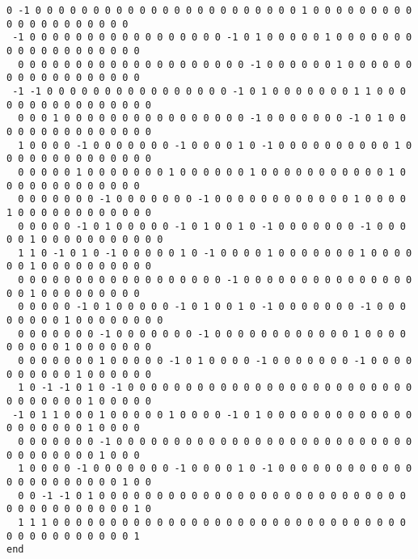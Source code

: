 \documentclass[%
  twocolumn,
 showpacs,
 showkeys,
 preprintnumbers,
 amsmath,amssymb,
 aps,
  pra,
  longbibliography,
 floatfix,
 ]{revtex4-1}
\begin{document}
{\begin{lstlisting}[backgroundcolor=\color{yellow!10},framerule=0pt,breaklines=true, frame=tb]
  0 -1 0 0 0 0 0 0 0 0 0 0 0 0 0 0 0 0 0 0 0 0 0 0 0 1 0 0 0 0 0 0 0 0 0 0 0 0 0 0 0 0 0 0 0 0
 -1 0 0 0 0 0 0 0 0 0 0 0 0 0 0 0 0 0 -1 0 1 0 0 0 0 0 1 0 0 0 0 0 0 0 0 0 0 0 0 0 0 0 0 0 0 0
  0 0 0 0 0 0 0 0 0 0 0 0 0 0 0 0 0 0 0 0 -1 0 0 0 0 0 0 1 0 0 0 0 0 0 0 0 0 0 0 0 0 0 0 0 0 0
 -1 -1 0 0 0 0 0 0 0 0 0 0 0 0 0 0 0 0 -1 0 1 0 0 0 0 0 0 0 1 1 0 0 0 0 0 0 0 0 0 0 0 0 0 0 0 0
  0 0 0 1 0 0 0 0 0 0 0 0 0 0 0 0 0 0 0 0 -1 0 0 0 0 0 0 0 -1 0 1 0 0 0 0 0 0 0 0 0 0 0 0 0 0 0
  1 0 0 0 0 -1 0 0 0 0 0 0 0 -1 0 0 0 0 1 0 -1 0 0 0 0 0 0 0 0 0 0 1 0 0 0 0 0 0 0 0 0 0 0 0 0 0
  0 0 0 0 0 1 0 0 0 0 0 0 0 1 0 0 0 0 0 0 1 0 0 0 0 0 0 0 0 0 0 0 1 0 0 0 0 0 0 0 0 0 0 0 0 0
  0 0 0 0 0 0 0 -1 0 0 0 0 0 0 0 -1 0 0 0 0 0 0 0 0 0 0 0 0 1 0 0 0 0 1 0 0 0 0 0 0 0 0 0 0 0 0
  0 0 0 0 0 -1 0 1 0 0 0 0 0 -1 0 1 0 0 1 0 -1 0 0 0 0 0 0 0 -1 0 0 0 0 0 1 0 0 0 0 0 0 0 0 0 0 0
  1 1 0 -1 0 1 0 -1 0 0 0 0 0 1 0 -1 0 0 0 0 1 0 0 0 0 0 0 0 1 0 0 0 0 0 0 1 0 0 0 0 0 0 0 0 0 0
  0 0 0 0 0 0 0 0 0 0 0 0 0 0 0 0 0 0 -1 0 0 0 0 0 0 0 0 0 0 0 0 0 0 0 0 0 1 0 0 0 0 0 0 0 0 0
  0 0 0 0 0 -1 0 1 0 0 0 0 0 -1 0 1 0 0 1 0 -1 0 0 0 0 0 0 0 -1 0 0 0 0 0 0 0 0 1 0 0 0 0 0 0 0 0
  0 0 0 0 0 0 0 -1 0 0 0 0 0 0 0 -1 0 0 0 0 0 0 0 0 0 0 0 0 1 0 0 0 0 0 0 0 0 0 1 0 0 0 0 0 0 0
  0 0 0 0 0 0 0 1 0 0 0 0 0 -1 0 1 0 0 0 0 -1 0 0 0 0 0 0 0 -1 0 0 0 0 0 0 0 0 0 0 1 0 0 0 0 0 0
  1 0 -1 -1 0 1 0 -1 0 0 0 0 0 0 0 0 0 0 0 0 0 0 0 0 0 0 0 0 0 0 0 0 0 0 0 0 0 0 0 0 1 0 0 0 0 0
 -1 0 1 1 0 0 0 1 0 0 0 0 0 1 0 0 0 0 -1 0 1 0 0 0 0 0 0 0 0 0 0 0 0 0 0 0 0 0 0 0 0 1 0 0 0 0
  0 0 0 0 0 0 0 -1 0 0 0 0 0 0 0 0 0 0 0 0 0 0 0 0 0 0 0 0 0 0 0 0 0 0 0 0 0 0 0 0 0 0 1 0 0 0
  1 0 0 0 0 -1 0 0 0 0 0 0 0 -1 0 0 0 0 1 0 -1 0 0 0 0 0 0 0 0 0 0 0 0 0 0 0 0 0 0 0 0 0 0 1 0 0
  0 0 -1 -1 0 1 0 0 0 0 0 0 0 0 0 0 0 0 0 0 0 0 0 0 0 0 0 0 0 0 0 0 0 0 0 0 0 0 0 0 0 0 0 0 1 0
  1 1 1 0 0 0 0 0 0 0 0 0 0 0 0 0 0 0 0 0 0 0 0 0 0 0 0 0 0 0 0 0 0 0 0 0 0 0 0 0 0 0 0 0 0 1
end

\end{lstlisting}  }
\end{document}
